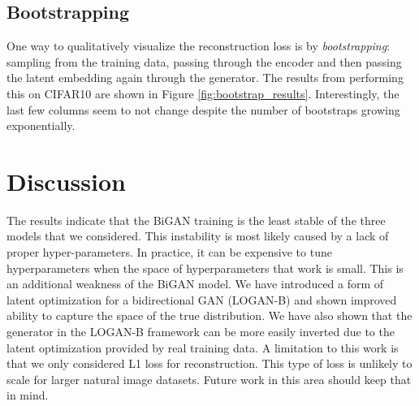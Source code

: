 \documentclass[10pt,twocolumn,letterpaper]{article}
\begin{document}
\subsection{Bootstrapping}

One way to qualitatively visualize the reconstruction loss is by \textit{bootstrapping}: sampling from the training data, passing through the encoder and then passing the latent embedding again through the generator. The results from performing this on CIFAR10 are shown in Figure \ref{fig:bootstrap_results}. Interestingly, the last few columns seem to not change despite the number of bootstraps growing exponentially.


\section{Discussion}

The results indicate that the BiGAN training is the least stable of the three models that we considered. This instability is most likely caused by a lack of proper hyper-parameters. In practice, it can be expensive to tune hyperparameters when the space of hyperparameters that work is small. This is an additional weakness of the BiGAN model.
We have introduced a form of latent optimization for a bidirectional GAN (LOGAN-B) and shown improved ability to capture the space of the true distribution. We have also shown that the generator in the LOGAN-B framework can be more easily inverted due to the latent optimization provided by real training data.
A limitation to this work is that we only considered L1 loss for reconstruction. This type of loss is unlikely to scale for larger natural image datasets. Future work in this area should keep that in mind.

{\small


}
\end{document}

